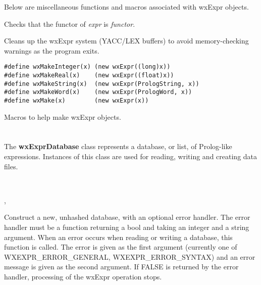 
Below are miscellaneous functions and macros associated with wxExpr objects.


Checks that the functor of {\it expr} is {\it functor}.


Cleans up the wxExpr system (YACC/LEX buffers) to avoid memory-checking warnings as the program exits.

\begin{verbatim}
#define wxMakeInteger(x) (new wxExpr((long)x))
#define wxMakeReal(x)    (new wxExpr((float)x))
#define wxMakeString(x)  (new wxExpr(PrologString, x))
#define wxMakeWord(x)    (new wxExpr(PrologWord, x))
#define wxMake(x)        (new wxExpr(x))
\end{verbatim}

Macros to help make wxExpr objects.

\section{}\label{wxexprdatabase}

The {\bf wxExprDatabase} class represents a database, or list,
of Prolog-like expressions.  Instances of this class are used for reading,
writing and creating data files.


\\


, 


\label{wxexprdatabaseconstr}


Construct a new, unhashed database, with an optional error handler. The
error handler must be a function returning a bool and taking an integer and a string
argument. When an error occurs when reading or writing a database, this function is
called. The error is given as the first argument (currently one of WXEXPR\_ERROR\_GENERAL,
WXEXPR\_ERROR\_SYNTAX) and an error message is given as the second argument. If FALSE
is returned by the error handler, processing of the wxExpr operation stops.

